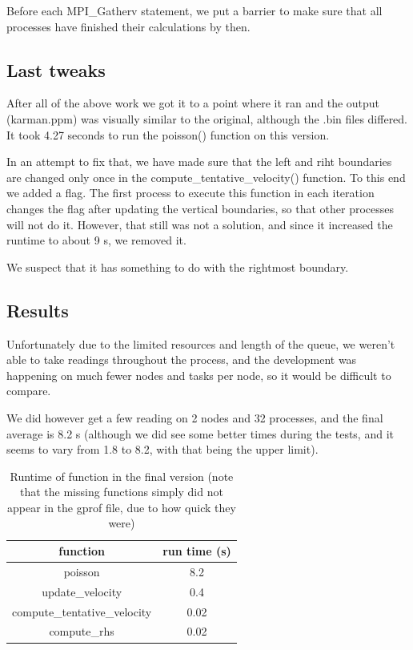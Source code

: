 \documentclass[11pt,journal]{article}
\begin{document}
	Before each MPI\_Gatherv statement, we put a barrier to make sure that all processes have finished their calculations by then.
	
	\subsection{Last tweaks}
	After all of the above work we got it to a point where it ran and the output (karman.ppm) was visually similar to the original, although the .bin files differed. It took 4.27 seconds to run the poisson() function on this version.
	
	In an attempt to fix that, we have made sure that the left and riht boundaries are changed only once in the compute\_tentative\_velocity() function. To this end we added a flag. The first process to execute this function in each iteration changes the flag after updating the vertical boundaries, so that other processes will not do it. However, that still was not a solution, and since it increased the runtime to about 9 s, we removed it.
	
	We suspect that it has something to do with the rightmost boundary.
	
	
	\subsection{Results}
	Unfortunately due to the limited resources and length of the queue, we weren't able to take readings throughout the process, and the development was happening on much fewer nodes and tasks per node, so it would be difficult to compare.
	
	We did however get a  few reading on 2 nodes and 32 processes, and the final average is 8.2 s (although we did see some better times during the tests, and it seems to vary from 1.8 to 8.2, with that being the upper limit).
	
	\begin{table}[h]
		\centering
		\begin{tabular}{c|c}
			function & run time (s)  \\
			\hline
			poisson & 8.2 \\
			update\_velocity & 0.4 \\
			compute\_tentative\_velocity & 0.02 \\
			compute\_rhs & 0.02 \\
		\end{tabular}
	\caption{Runtime of function in the final version (note that the missing functions simply did not appear in the gprof file, due to how quick they were)}
	\end{table}
	
\end{document}
